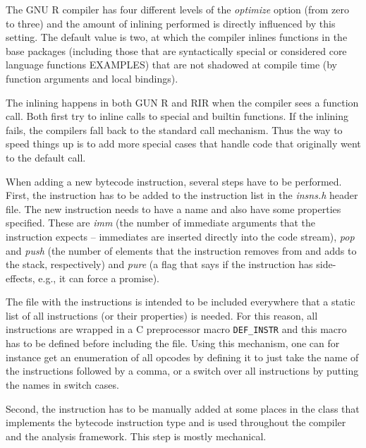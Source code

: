 
The GNU R compiler has four different levels of the \emph{optimize} option (from zero to three) and the amount of inlining performed is directly influenced by this setting. The default value is two, at which the compiler inlines functions in the base packages (including those that are syntactically special or considered core language functions EXAMPLES) that are not shadowed at compile time (by function arguments and local bindings).


The inlining happens in both GUN R and RIR when the compiler sees a function call. Both first try to inline calls to special and builtin functions. If the inlining fails, the compilers fall back to the standard call mechanism. Thus the way to speed things up is to add more special cases that handle code that originally went to the default call.


When adding a new bytecode instruction, several steps have to be performed. First, the instruction has to be added to the instruction list in the \emph{insns.h} header file. The new instruction needs to have a name and also have some properties specified. These are \emph{imm} (the number of immediate arguments that the instruction expects -- immediates are inserted directly into the code stream), \emph{pop} and \emph{push} (the number of elements that the instruction removes from and adds to the stack, respectively) and \emph{pure} (a flag that says if the instruction has side-effects, e.g., it can force a promise).


The file with the instructions is intended to be included everywhere that a static list of all instructions (or their properties) is needed. For this reason, all instructions are wrapped in a C preprocessor macro \verb/DEF_INSTR/ and this macro has to be defined before including the file. Using this mechanism, one can for instance get an enumeration of all opcodes by defining it to just take the name of the instructions followed by a comma, or a switch over all instructions by putting the names in switch cases.


Second, the instruction has to be manually added at some places in the class that implements the bytecode instruction type and is used throughout the compiler and the analysis framework. This step is mostly mechanical.

